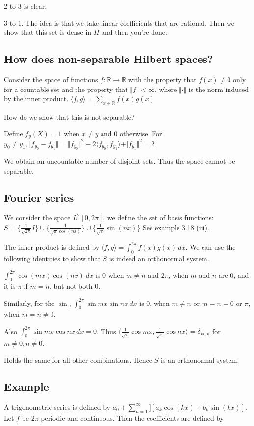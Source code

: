 \documentclass[11pt]{article}
\def\R{\mathbb{R}}
\begin{document}
2 to 3 is clear.

3 to 1. The idea is that we take linear coefficients that are rational. Then
we show that this set is dense in \(H\) and then you're done.
\subsection{How does non-separable Hilbert spaces?}
\label{sec:orgf18f098}
Consider the space of functions \(f\colon \R \rightarrow \R\) with the property
that \(f(x)\neq 0\) only for a countable set and the property that \(\Vert f
   \Vert < \infty\), where \(\Vert \cdot \Vert\) is the norm induced by the inner
product. \(\langle f, g \rangle = \sum_{x\in \R} f(x)g(x)\)

How do we show that this is not separable? 

Define \(f_y(X) = 1\) when \(x \neq y\) and \(0\) otherwise. For \(y_0 \neq y_1,
   \Vert f_{y_0} - f_{y_1} \Vert = \Vert f_{y_0}\Vert^2 - 2\langle f_{y_0},
   f_{y_1}\rangle + \Vert f_{y_1}\Vert^2 = 2\)

We obtain an uncountable number of disjoint sets. Thus the space cannot be
separable.
\subsection{Fourier series}
\label{sec:org4596f4e}
We consider the space \(L^2[0, 2\pi]\), we define the set of basis functions:
\(S = \{\frac{1}{\sqrt{2\pi}} I\} \cup \{\frac{1}{\sqrt{\pi} \cos(nx)}\} \cup
   \{\frac{1}{\sqrt{\pi}}\sin(nx)\}\) See example 3.18 (iii).

The inner product is defined by \(\langle f, g \rangle = \int_0^{2\pi}
   f(x)g(x)\ dx\). We can use the following identities to show that \(S\) is indeed
an orthonormal system.

\(\int_0^{2\pi} \cos(mx) \cos(nx)\ dx\) is \(0\) when \(m\neq n\) and \(2\pi\), when
\(m\) and \(n\) are \(0\), and it is \(\pi\) if \(m = n\), but not both \(0\).

Similarly, for the \(\sin\), \(\int_{0}^{2\pi} \sin{mx}\sin{nx}\ dx\) is \(0\),
when \(m\neq n\) or \(m=n=0\) or \(\pi\), when \(m=n\neq 0\).

Also \(\int_0^{2\pi} \sin mx \cos nx\ dx = 0\). Thus \(\langle
   \frac{1}{\sqrt{\pi}} \cos mx, \frac{1}{\sqrt{\pi}} \cos nx\rangle =
   \delta_{m, n}\) for \(m \neq 0, n \neq 0\).

Holds the same for all other combinations. Hence \(S\) is an orthonormal
system.
\subsection{Example}
\label{sec:org4f60f42}
A trigonometric series is defined by \(a_0 + \sum_{n=1}^\infty][a_k \cos(kx) +
   b_k \sin(kx)]\). Let \(f\) be \(2\pi\) periodic and continuous. Then the
coefficients are defined by
\end{document}
